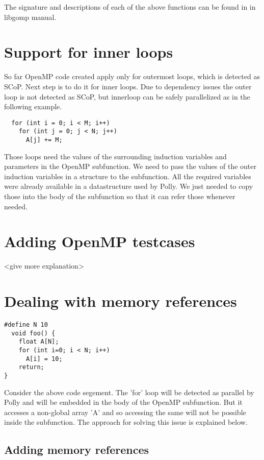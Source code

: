 The signature and descriptions of each of the above functions can be found in in libgomp manual\cite{libgomp}.

\section{Support for inner loops}

So far OpenMP code created apply only for outermost loops, which is detected as SCoP. Next step is to do it for
inner loops. Due to dependency issues the outer loop is not detected as SCoP, but innerloop can be safely
parallelized as in the following example.

\begin{lstlisting}
  for (int i = 0; i < M; i++)
    for (int j = 0; j < N; j++)
      A[j] += M;
\end{lstlisting}

Those loops need the values of the surrounding induction variables and parameters in the OpenMP subfunction. We need
to pass the values of the outer induction variables in a structure to the subfunction. All the required variables
were already available in a datastructure used by Polly. We just needed to copy those into the body of the subfunction
so that it can refer those whenever needed.

\section{Adding OpenMP testcases}

<give more explanation>

\section{Dealing with memory references}

\begin{lstlisting}
#define N 10
  void foo() {
    float A[N];
    for (int i=0; i < N; i++)
      A[i] = 10;
    return;
}
\end{lstlisting}

Consider the above code segement. The 'for' loop will be detected as parallel by Polly and will be embedded in the
body of the OpenMP subfunction. But it accesses a non-global array 'A' and so accessing the same will not be possible inside
the subfunction. The approach for solving this issue is explained below.

\subsection{Adding memory references}

